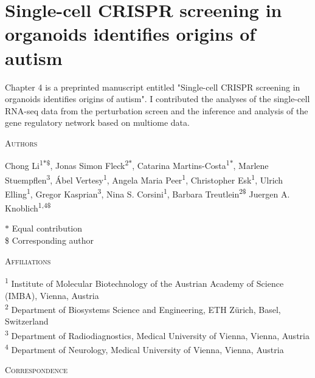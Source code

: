 \thispagestyle{plain}
\section{Single-cell CRISPR screening in organoids identifies origins of autism}

\vspace{0.5cm}

Chapter 4 is a preprinted manuscript entitled "Single-cell CRISPR screening in organoids identifies origins of autism". I contributed the analyses of the single-cell RNA-seq data from the perturbation screen and the inference and analysis of the gene regulatory network based on multiome data.

\vspace{1cm}

\noindent
{\large\textsc{Authors}}

\noindent
Chong Li\textsuperscript{1$*$\$}, 
Jonas Simon Fleck\textsuperscript{2$*$}, 
Catarina Martins-Costa\textsuperscript{1$*$}, 
Marlene Stuempflen\textsuperscript{3}, 
Ábel Vertesy\textsuperscript{1}, 
Angela Maria Peer\textsuperscript{1}, 
Christopher Esk\textsuperscript{1}, 
Ulrich Elling\textsuperscript{1}, 
Gregor Kasprian\textsuperscript{3}, 
Nina S. Corsini\textsuperscript{1}, 
Barbara Treutlein\textsuperscript{2\$}
Juergen A. Knoblich\textsuperscript{1,4\$}

\vspace{0.5cm}

\noindent
$\ast$ Equal contribution\\
\$ Corresponding author

\vspace{1cm}

\noindent
{\large\textsc{Affiliations}}

\noindent
\textsuperscript{1} Institute of Molecular Biotechnology of the Austrian Academy of Science (IMBA), Vienna, Austria\\
\textsuperscript{2} Department of Biosystems Science and Engineering, ETH Zürich, Basel, Switzerland\\
\textsuperscript{3} Department of Radiodiagnostics, Medical University of Vienna, Vienna, Austria\\
\textsuperscript{4} Department of Neurology, Medical University of Vienna, Vienna, Austria

\vspace{1cm}

\noindent
{\large\textsc{Correspondence}} 

